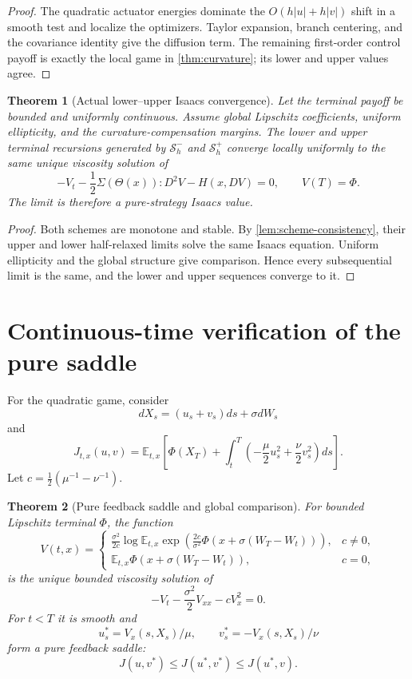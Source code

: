 \documentclass[11pt,reqno]{amsart}
\newtheorem{theorem}{Theorem}[section]
\theoremstyle{definition}
\theoremstyle{remark}
\newcommand{\E}{\mathbb E}
\newcommand{\abs}[1]{\left\lvert #1\right\rvert}
\begin{document}
\begin{proof}
The quadratic actuator energies dominate the $O(h\abs u+h\abs v)$ shift in a
smooth test and localize the optimizers.  Taylor expansion, branch centering,
and the covariance identity give the diffusion term.  The remaining
first-order control payoff is exactly the local game in
\cref{thm:curvature}; its lower and upper values agree.
\end{proof}

\begin{theorem}[Actual lower--upper Isaacs convergence]\label{thm:scheme-limit}
Let the terminal payoff be bounded and uniformly continuous.  Assume global
Lipschitz coefficients, uniform ellipticity, and the curvature-compensation
margins.  The lower and upper terminal recursions generated by
$\mathcal S_h^-$ and $\mathcal S_h^+$ converge locally uniformly to the same
unique viscosity solution of
\begin{equation}\label{eq:Isaacs}
 -V_t-\frac12\Sigma(\Theta(x)):D^2V-H(x,DV)=0,
 \qquad V(T)=\Phi.
\end{equation}
The limit is therefore a pure-strategy Isaacs value.
\end{theorem}

\begin{proof}
Both schemes are monotone and stable.  By
\cref{lem:scheme-consistency}, their upper and lower half-relaxed limits solve
the same Isaacs equation.  Uniform ellipticity and the global structure give
comparison.  Hence every subsequential limit is the same, and the lower and
upper sequences converge to it.
\end{proof}

\section{Continuous-time verification of the pure saddle}\label{sec:verify}

For the quadratic game, consider
\[
 dX_s=(u_s+v_s)ds+\sigma dW_s
\]
and
\[
 J_{t,x}(u,v)=\E_{t,x}\left[
 \Phi(X_T)+\int_t^T
 \left(-\frac\mu2u_s^2+
 \frac\nu2v_s^2\right)ds\right].
\]
Let $c=\frac12(\mu^{-1}-\nu^{-1})$.

\begin{theorem}[Pure feedback saddle and global comparison]\label{thm:feedback}
For bounded Lipschitz terminal $\Phi$, the function
\begin{equation}\label{eq:ColeHopf-value}
 V(t,x)=
 \begin{cases}
 \displaystyle\frac{\sigma^2}{2c}
 \log\E_{t,x}\exp\left(\frac{2c}{\sigma^2}\Phi(x+\sigma(W_T-W_t))\right),
 &c\ne0,\\[2ex]
 \E_{t,x}\Phi(x+\sigma(W_T-W_t)),&c=0,
 \end{cases}
\end{equation}
is the unique bounded viscosity solution of
\[
 -V_t-\frac{\sigma^2}{2}V_{xx}-cV_x^2=0.
\]
For $t<T$ it is smooth and
\[
 u_s^*=V_x(s,X_s)/\mu,
 \qquad v_s^*=-V_x(s,X_s)/\nu
\]
form a pure feedback saddle:
\[
 J(u,v^*)\le J(u^*,v^*)\le J(u^*,v).
\]
\end{theorem}
\end{document}
